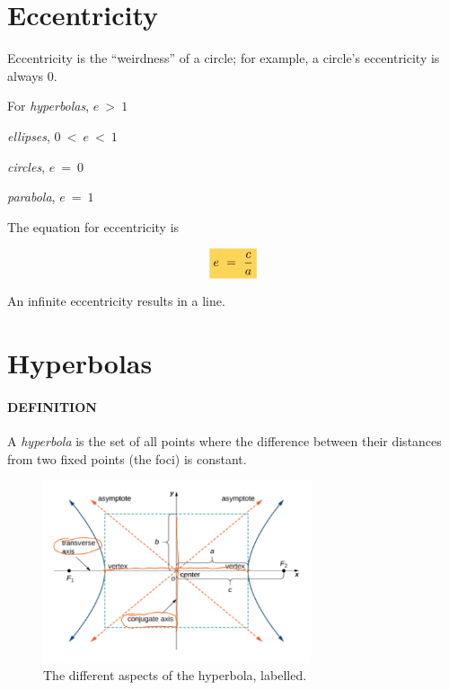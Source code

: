 \documentclass{article}
\newcommand{\highlight}[1]{%
  \colorbox{yellowOrange}{$\displaystyle#1$}}
\begin{document}
\section{Eccentricity}

Eccentricity is the ``weirdness'' of a circle; for example, a circle's eccentricity is always 0.

For \textit{hyperbolas}, $e\ >\ 1$

    \hspace{1.1cm}\textit{ellipses},   $0\ <\ e\ <\ 1$

    \hspace{1.25cm}\textit{circles},    $e\ =\ 0$

    \hspace{1cm}\textit{parabola},   $e\ =\ 1$

The equation for eccentricity is

\begin{equation*}
  \highlight{e\ =\ \frac{c}{a}}
\end{equation*}

An infinite eccentricity results in a line.

\newpage
\section{Hyperbolas}

\paragraph{DEFINITION} A \emph{hyperbola} is the set of all points where the difference between their distances from two fixed points (the foci) is constant.

\begin{figure}[H]
  \includegraphics[width=0.7\textwidth,center]{Hyperbola Labelled.png}
  \caption{The different aspects of the hyperbola, labelled.}
  \label{fig:hyperbola1}
\end{figure}
\end{document}
